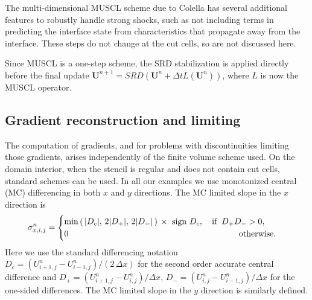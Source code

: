 
The multi-dimensional MUSCL scheme due to Colella has several additional
features to robustly handle strong shocks, such as not including terms in
predicting the interface state from characteristics that propagate 
away from the interface. These
steps do not change at the cut cells, so are not discussed here.  

Since MUSCL is a one-step scheme, the SRD stabilization is applied directly
before the final update
$\mathbf{U}^{n+1} = SRD(\mathbf{U}^{n} + \Delta t
L(\mathbf{U}^{n}))$, where $L$ is now the MUSCL operator.



\subsection{Gradient reconstruction and limiting }\label{sec:limit}

The computation of gradients, and for problems with discontinuities limiting
those gradients, arises independently of the finite volume scheme used. 
On the domain interior, when the stencil is regular and does not contain cut cells, standard schemes can be used.
In all our examples we use monotonized central (MC) differencing in both $x$ and $y$ directions.  The MC limited slope in the $x$ direction is
\begin{equation}
\sigma^n_{x,i,j} =  \begin{cases} 
\min \left ( \,  \lvert{ D_c}\rvert,\,
2 \lvert {D_+}\rvert,\,
2 \lvert{D_-}\rvert \,  \right ) \,\times 
\text{ sign } D_c, \quad \text{if} \;\;  D_+ D_- >  0,\\
0 \hspace*{2.8in} \text{otherwise}.
\end{cases}
\end{equation}
Here we use the standard differencing notation
$D_c = (U^n_{i+1,j}-U^n_{i-1,j})/(2 \, \Delta x)$ for the second order accurate central difference and
$D_+ = (U^n_{i+1,j}-U^n_{i,j})/\Delta x$,
$D_- = (U^n_{i,j}-U^n_{i-1,j})/\Delta x$ for the one-sided differences.  The MC limited slope in the $y$ direction is similarly defined.

